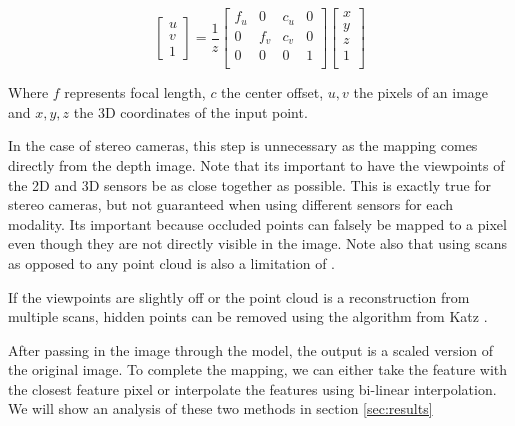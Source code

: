 \documentclass[10pt,twocolumn,letterpaper]{article}
\newcommand{\AJ}[1]{{\color{red}{[Andrej: #1]}}}
\begin{document}
\begin{equation}
    \begin{bmatrix}
        u \\
        v \\
        1
    \end{bmatrix} = \frac{1}{z}
    \begin{bmatrix}
        f_u & 0   & c_u & 0 \\
        0   & f_v & c_v & 0 \\
        0   & 0   & 0   & 1 \\
    \end{bmatrix}
    \begin{bmatrix}
        x \\
        y \\
        z \\
        1 \\
    \end{bmatrix}
    \label{eq:pinhole}
\end{equation}

\AJ{Is this equation necessary or is this considered common knowledge}

Where $f$ represents focal length, $c$ the center offset, $u,v$ the pixels of an image and $x,y,z$ the 3D coordinates of the input point.

In the case of stereo cameras, this step is unnecessary as the mapping comes directly from the depth image. Note that its important to have the viewpoints of the 2D and 3D sensors be as close together as possible. This is exactly true for stereo cameras, but not guaranteed when using different sensors for each modality. Its important because occluded points can falsely be mapped to a pixel even though they are not directly visible in the image. Note also that using scans as opposed to any point cloud is also a limitation of \cite{xie2020pointcontrast}.

If the viewpoints are slightly off or the point cloud is a reconstruction from multiple scans, hidden points can be removed using the algorithm from Katz \etal \cite{katz2007Direct}.

After passing in the image through the model, the output is a scaled version of the original image. To complete the mapping, we can either take the feature with the closest feature pixel or interpolate the features using bi-linear interpolation. We will show an analysis of these two methods in section \ref{sec:results}

\AJ{Do I need to give the equation for Bi-linear interpolation or is this also considered basic knowledge}
\end{document}
